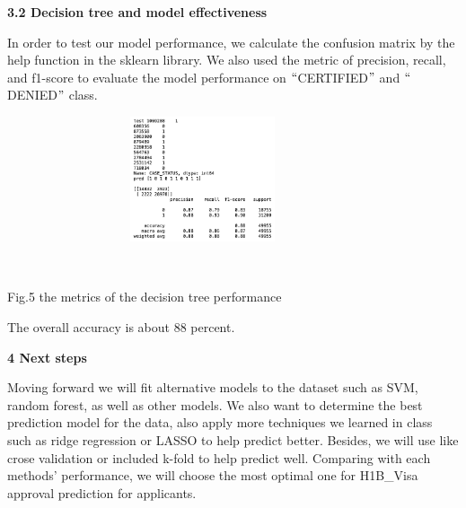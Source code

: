 \documentclass[12pt]{article}
\begin{document}
\textbf{3.2 Decision tree and model effectiveness}\par

\begin{justify}
In order to test our model performance, we calculate the confusion matrix by the help function in the sklearn library. We also used the metric of precision, recall, and f1-score to evaluate the model performance on $``$CERTIFIED$"$  and $``$DENIED$"$  class.
\end{justify}\par




\begin{figure}[H]
	\begin{Center}
		\includegraphics[width=3.69in,height=1.45in]{./media/image4.png}
	\end{Center}
\end{figure}



\ \ \ \ \ \ \ \ \ \ \ \ \ \ \ \ \ \ \ \  \par

\begin{Center}
{\fontsize{8pt}{9.6pt}\selectfont Fig.5 the metrics of the decision tree performance\par}
\end{Center}\par

The overall accuracy is about 88 percent.\par


\vspace{\baselineskip}
{\fontsize{14pt}{16.8pt}\selectfont \textbf{4 Next steps}\par}\par

\begin{justify}
Moving forward we will fit alternative models to the dataset such as SVM, random forest, as well as other models. We also want to determine the best prediction model for the data, also apply more techniques we learned in class such as ridge regression or LASSO to help predict better. Besides, we will use like crose validation or included k-fold to help predict well. Comparing with each methods’ performance, we will choose the most optimal one for H1B\_Visa approval prediction for applicants.
\end{justify}\par


\vspace{\baselineskip}

\printbibliography
\end{document}
